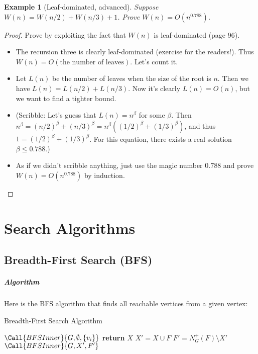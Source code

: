 \documentclass[11pt,a4paper,oneside,microtype,chapter,nokorean]{oblivoir}
\newtheorem{example}{Example}
\begin{document}
\begin{example}[Leaf-dominated, advanced] Suppose $W(n) = W(n/2) + W(n/3) + 1$.  Prove
  $W(n) = O(n^{0.788})$.
\end{example}

\begin{proof}
  Prove by exploiting the fact that $W(n)$ is leaf-dominated (page 96).

  \begin{itemize}
  \item The recursion three is clearly leaf-dominated (exercise for the readers!).  Thus
    $W(n) = O(\mbox{the number of leaves})$.  Let's count it.

  \item Let $L(n)$ be the number of leaves when the size of the root is $n$.  Then we have
    $L(n) = L(n/2) + L(n/3)$.  Now it's clearly $L(n) = O(n)$, but we want to find a tighter bound.

  \item (Scribble: Let's guess that $L(n) = n^\beta$ for some $\beta$.  Then
    $n^\beta = (n/2)^\beta + (n/3)^\beta = n^\beta ((1/2)^\beta + (1/3)^\beta)$, and thus
    $1 = (1/2)^\beta + (1/3)^\beta$.  For this equation, there exists a real solution
    $\beta \le 0.788$.)

  \item As if we didn't scribble anything, just use the magic number $0.788$ and prove
    $W(n) = O(n^{0.788})$ by induction.
  \end{itemize}
\end{proof}


\chapter{Search Algorithms}

\section{Breadth-First Search (BFS)}

\paragraph{Algorithm}

Here is the BFS algorithm that finds all reachable vertices from a given vertex:

\begin{algorithm}
  \caption{Breadth-First Search Algorithm}\label{bfs}
  \begin{algorithmic}[1]
     
    \State $\Call{BFSInner}{G,\emptyset,\{v_i\}}$
    \EndProcedure
    \Statex
     
     
    \State \textbf{return} $X$
    \EndIf
    \State $X' = X \cup F$ 
    \State $F' = N^+_G(F) \setminus X'$ 
    \State $\Call{BFSInner}{G,X',F'}$
    \EndProcedure
  \end{algorithmic}
\end{algorithm}
\end{document}
